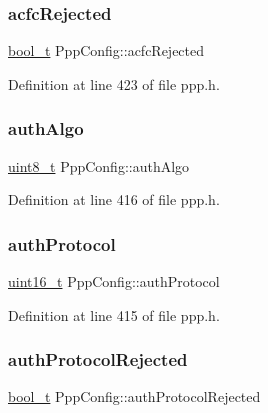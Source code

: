 \subsubsection{\texorpdfstring{acfc\+Rejected}{acfcRejected}}
{\footnotesize\ttfamily \hyperlink{compiler__port_8h_a812d16e5494522586b3784e55d479912}{bool\+\_\+t} Ppp\+Config\+::acfc\+Rejected}



Definition at line 423 of file ppp.\+h.

\mbox{\label{structPppConfig_a60bdf669d3bb035e102b9521e3c7d880}} 
\subsubsection{\texorpdfstring{auth\+Algo}{authAlgo}}
{\footnotesize\ttfamily \hyperlink{stdint_8h_aba7bc1797add20fe3efdf37ced1182c5}{uint8\+\_\+t} Ppp\+Config\+::auth\+Algo}



Definition at line 416 of file ppp.\+h.

\mbox{\label{structPppConfig_aee8588570fbb615a08849fc6f34cdce7}} 
\subsubsection{\texorpdfstring{auth\+Protocol}{authProtocol}}
{\footnotesize\ttfamily \hyperlink{stdint_8h_a273cf69d639a59973b6019625df33e30}{uint16\+\_\+t} Ppp\+Config\+::auth\+Protocol}



Definition at line 415 of file ppp.\+h.

\mbox{\label{structPppConfig_a9d6b8dc627521b196c855a59e4989e92}} 
\subsubsection{\texorpdfstring{auth\+Protocol\+Rejected}{authProtocolRejected}}
{\footnotesize\ttfamily \hyperlink{compiler__port_8h_a812d16e5494522586b3784e55d479912}{bool\+\_\+t} Ppp\+Config\+::auth\+Protocol\+Rejected}




